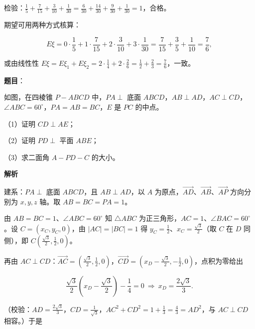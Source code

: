 \begin{answer}
检验：$\frac15+\frac7{15}+\frac3{10}+\frac1{30}=\frac6{30}+\frac{14}{30}+\frac9{30}+\frac1{30}=1$，合格。

期望可用两种方式核算：

\nopagebreak[4]
\[E\xi=0\cdot\frac15+1\cdot\frac7{15}+2\cdot\frac3{10}+3\cdot\frac1{30}=\frac7{15}+\frac35+\frac1{10}=\frac76,\]

或由线性性 $E\xi=E\xi_1+E\xi_2=2\cdot\frac14+2\cdot\frac26=\frac12+\frac23=\frac76$，一致。


\end{answer}
\begin{answer}

\textbf{题目}：

如图，在四棱锥 $P-ABCD$ 中，$PA\perp$ 底面 $ABCD$，$AB\perp AD$，$AC\perp CD$，$\angle ABC=60^\circ$，$PA=AB=BC$，$E$ 是 $PC$ 的中点。

（1）证明 $CD\perp AE$；

（2）证明 $PD\perp$ 平面 $ABE$；

（3）求二面角 $A-PD-C$ 的大小。
\nopagebreak[4]
\begin{center}\end{center}
\nopagebreak[4]
\textbf{解析}

建系：$PA\perp$ 底面 $ABCD$，且 $AB\perp AD$，以 $A$ 为原点，$\overrightarrow{AD}$、$\overrightarrow{AB}$、$\overrightarrow{AP}$ 方向分别为 $x,y,z$ 轴。取 $AB=BC=PA=1$。

由 $AB=BC=1$、$\angle ABC=60^\circ$ 知 $\triangle ABC$ 为正三角形，$AC=1$、$\angle BAC=60^\circ$。设 $C=(x_C,y_C,0)$，由 $|AC|=|BC|=1$ 得 $y_C=\frac12$、$x_C=\frac{\sqrt3}2$（取 $C$ 在 $D$ 同侧），即 $C\left(\frac{\sqrt3}2,\frac12,0\right)$。

再由 $AC\perp CD$：$\overrightarrow{AC}=\left(\frac{\sqrt3}2,\frac12,0\right)$，$\overrightarrow{CD}=\left(x_D-\frac{\sqrt3}2,-\frac12,0\right)$，点积为零给出

\nopagebreak[4]
\[\frac{\sqrt3}2\left(x_D-\frac{\sqrt3}2\right)-\frac14=0\ \Longrightarrow\ x_D=\frac{2\sqrt3}3 .\]

（校验：$AD=\frac{2\sqrt3}3$，$CD=\frac1{\sqrt3}$，$AC^2+CD^2=1+\frac13=\frac43=AD^2$，与 $AC\perp CD$ 相容。）于是


\end{answer}
